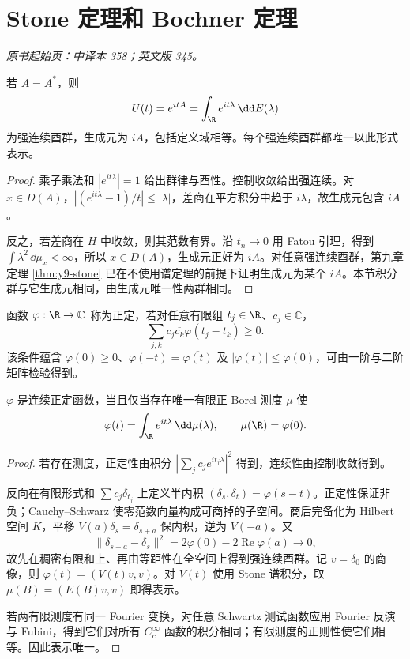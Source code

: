 \section{Stone 定理和 Bochner 定理}\label{sec:yosida-11-13}
\noindent\textit{原书起始页：中译本 358；英文版 345。}

\begin{theorem}\label{thm:y11-stone}
若 $A=A^*$，则
\[
 U(t)=e^{itA}=\int_\R e^{it\lambda}\,\dd E(\lambda)
\]
为强连续酉群，生成元为 $iA$，包括定义域相等。每个强连续酉群都唯一以此形式表示。
\end{theorem}
\begin{proof}
乘子乘法和 $|e^{it\lambda}|=1$ 给出群律与酉性。控制收敛给出强连续。对 $x\in D(A)$，$|(e^{it\lambda}-1)/t|\le|\lambda|$，差商在平方积分中趋于 $i\lambda$，故生成元包含 $iA$。

反之，若差商在 $H$ 中收敛，则其范数有界。沿 $t_n\to0$ 用 Fatou 引理，得到 $\int\lambda^2\,\dd\mu_x<\infty$，所以 $x\in D(A)$，生成元正好为 $iA$。对任意强连续酉群，第九章定理 \ref{thm:y9-stone} 已在不使用谱定理的前提下证明生成元为某个 $iA$。本节积分群与它生成元相同，由生成元唯一性两群相同。
\end{proof}

\begin{definition}[正定函数]
函数 $\varphi:\R\to\mathbb C$ 称为正定，若对任意有限组 $t_j\in\R$、$c_j\in\mathbb C$，
\[
 \sum_{j,k}c_j\overline{c_k}\varphi(t_j-t_k)\ge0.
\]
该条件蕴含 $\varphi(0)\ge0$、$\varphi(-t)=\overline{\varphi(t)}$ 及 $|\varphi(t)|\le\varphi(0)$，可由一阶与二阶矩阵检验得到。
\end{definition}

\begin{theorem}[Bochner 表示]\label{thm:y11-bochner}
$\varphi$ 是连续正定函数，当且仅当存在唯一有限正 Borel 测度 $\mu$ 使
\[
 \varphi(t)=\int_\R e^{it\lambda}\,\dd\mu(\lambda),\qquad
 \mu(\R)=\varphi(0).
\]
\end{theorem}
\begin{proof}
若存在测度，正定性由积分 $|\sum_jc_je^{it_j\lambda}|^2$ 得到，连续性由控制收敛得到。

反向在有限形式和 $\sum c_j\delta_{t_j}$ 上定义半内积 $(\delta_s,\delta_t)=\varphi(s-t)$。正定性保证非负；Cauchy--Schwarz 使零范数向量构成可商掉的子空间。商后完备化为 Hilbert 空间 $K$，平移 $V(a)\delta_s=\delta_{s+a}$ 保内积，逆为 $V(-a)$。又
\[
 \|\delta_{s+a}-\delta_s\|^2=2\varphi(0)-2\operatorname{Re}\varphi(a)\longrightarrow0,
\]
故先在稠密有限和上、再由等距性在全空间上得到强连续酉群。记 $v=\delta_0$ 的商像，则 $\varphi(t)=(V(t)v,v)$。对 $V(t)$ 使用 Stone 谱积分，取 $\mu(B)=(E(B)v,v)$ 即得表示。

若两有限测度有同一 Fourier 变换，对任意 Schwartz 测试函数应用 Fourier 反演与 Fubini，得到它们对所有 $C_c^\infty$ 函数的积分相同；有限测度的正则性使它们相等。因此表示唯一。
\end{proof}

